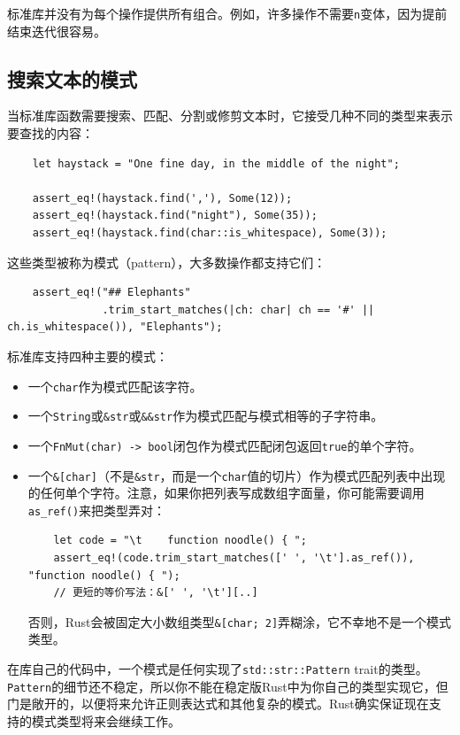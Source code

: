 标准库并没有为每个操作提供所有组合。例如，许多操作不需要\texttt{n}变体，因为提前结束迭代很容易。

\subsection{搜索文本的模式}\label{Patterns}

当标准库函数需要搜索、匹配、分割或修剪文本时，它接受几种不同的类型来表示要查找的内容：
\begin{verbatim}
    let haystack = "One fine day, in the middle of the night";

    assert_eq!(haystack.find(','), Some(12));
    assert_eq!(haystack.find("night"), Some(35));
    assert_eq!(haystack.find(char::is_whitespace), Some(3));
\end{verbatim}

这些类型被称为模式（pattern），大多数操作都支持它们：
\begin{verbatim}
    assert_eq!("## Elephants"
               .trim_start_matches(|ch: char| ch == '#' || ch.is_whitespace()), "Elephants");
\end{verbatim}

标准库支持四种主要的模式：
\begin{itemize}
    \item 一个\texttt{char}作为模式匹配该字符。
    \item 一个\texttt{String}或\texttt{\&str}或\texttt{\&\&str}作为模式匹配与模式相等的子字符串。
    \item 一个\texttt{FnMut(char) -> bool}闭包作为模式匹配闭包返回\texttt{true}的单个字符。
    \item 一个\texttt{\&[char]}（不是\texttt{\&str}，而是一个\texttt{char}值的切片）作为模式匹配列表中出现的任何单个字符。注意，如果你把列表写成数组字面量，你可能需要调用\texttt{as\_ref()}来把类型弄对：
\begin{verbatim}
    let code = "\t    function noodle() { ";
    assert_eq!(code.trim_start_matches([' ', '\t'].as_ref()), "function noodle() { ");
    // 更短的等价写法：&[' ', '\t'][..]
\end{verbatim}

    否则，Rust会被固定大小数组类型\texttt{\&[char; 2]}弄糊涂，它不幸地不是一个模式类型。
\end{itemize}

在库自己的代码中，一个模式是任何实现了\texttt{std::str::Pattern} trait的类型。\texttt{Pattern}的细节还不稳定，所以你不能在稳定版Rust中为你自己的类型实现它，但门是敞开的，以便将来允许正则表达式和其他复杂的模式。Rust确实保证现在支持的模式类型将来会继续工作。

